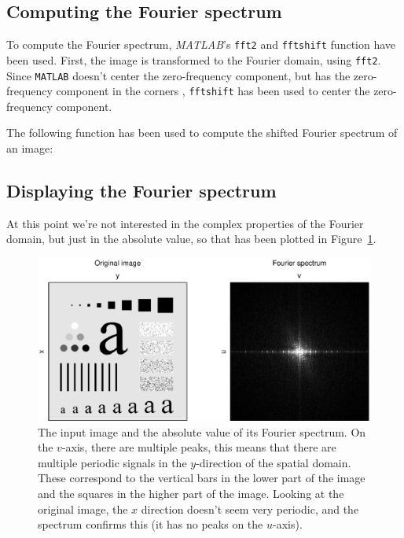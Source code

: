 \setcounter{subsection}{0}
\subsection{Computing the Fourier spectrum}
To compute the Fourier spectrum, \textit{MATLAB}'s \texttt{fft2} and \texttt{fftshift} function have been used.
First, the image is transformed to the Fourier domain, using \texttt{fft2}.
Since \texttt{MATLAB} doesn't center the zero-frequency component, but has the zero-frequency component in the corners \cite{fftshift}, \texttt{fftshift} has been used to center the zero-frequency component.

The following function has been used to compute the shifted Fourier spectrum of an image:

\subsection{Displaying the Fourier spectrum}
At this point we're not interested in the complex properties of the Fourier domain, but just in the absolute value, so that has been plotted in Figure~\ref{fig:characters_spectrum}.

\begin{figure}[h]
 \centering
 \includegraphics[width=\linewidth]{characters_spectrum.eps}
 \caption{
 	The input image and the absolute value of its Fourier spectrum.
 	On the \(v\)-axis, there are multiple peaks, this means that there are multiple periodic signals in the \(y\)-direction of the spatial domain.
 	These correspond to the vertical bars in the lower part of the image and the squares in the higher part of the image.
 	Looking at the original image, the \(x\) direction doesn't seem very periodic, and the spectrum confirms this (it has no peaks on the \(u\)-axis).}
 \label{fig:characters_spectrum}
\end{figure}

